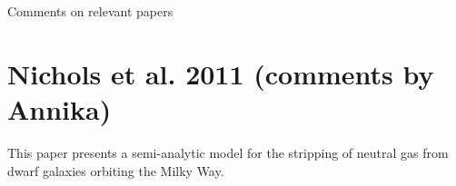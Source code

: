 \documentclass[11pt,longbibliography]{article}
\begin{document}
\noindent
\begin{centering}
\centerline{\Large{Comments on relevant papers}}\newline
\end{centering}
\vskip 0.3cm

\section{Nichols et al. 2011 (comments by Annika)}
This paper \citep{nichols2011} presents a semi-analytic model for the stripping of neutral gas from dwarf galaxies orbiting the Milky Way.  




\end{document}
